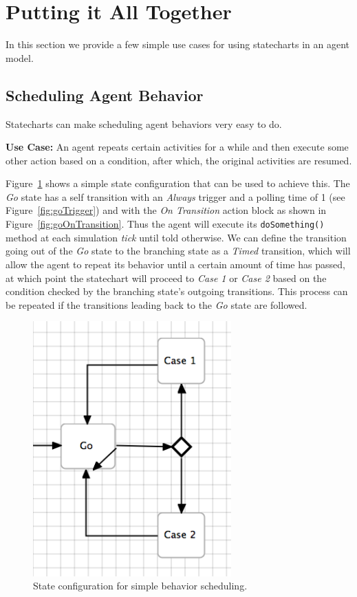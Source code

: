 \documentclass[11pt]{amsart}
\begin{document}
\section{Putting it All Together}
In this section we provide a few simple use cases for using statecharts in an agent model.

\subsection{Scheduling Agent Behavior}
Statecharts can make scheduling agent behaviors very easy to do.

\textbf{Use Case:} An agent repeats certain activities for a while and then execute some other action based on a condition, after which, the original activities are resumed.

Figure~\ref{fig:scheduleBehaviors} shows a simple state configuration that can be used to achieve this. The \emph{Go} state has a self transition with an \emph{Always} trigger and a polling time of 1 (see Figure~\ref{fig:goTrigger}) and with the \emph{On Transition} action block as shown in Figure~\ref{fig:goOnTransition}. Thus the agent will execute its \texttt{doSomething()} method at each simulation \emph{tick} until told otherwise. We can define the transition going out of the \emph{Go} state to the branching state as a \emph{Timed} transition, which will allow the agent to repeat its behavior until a certain amount of time has passed, at which point the statechart will proceed to \emph{Case 1} or \emph{Case 2} based on the condition checked by the branching state's outgoing transitions. This process can be repeated if the transitions leading back to the \emph{Go} state are followed.

\begin{figure}
\begin{center}
\vspace{.2in}
\centerline {
\includegraphics[width=3in]{StatechartsImages/ScheduleBehaviors.png}
}
\caption{State configuration for simple behavior scheduling.}
\label{fig:scheduleBehaviors}
\end{center}
\end{figure}
\end{document}
